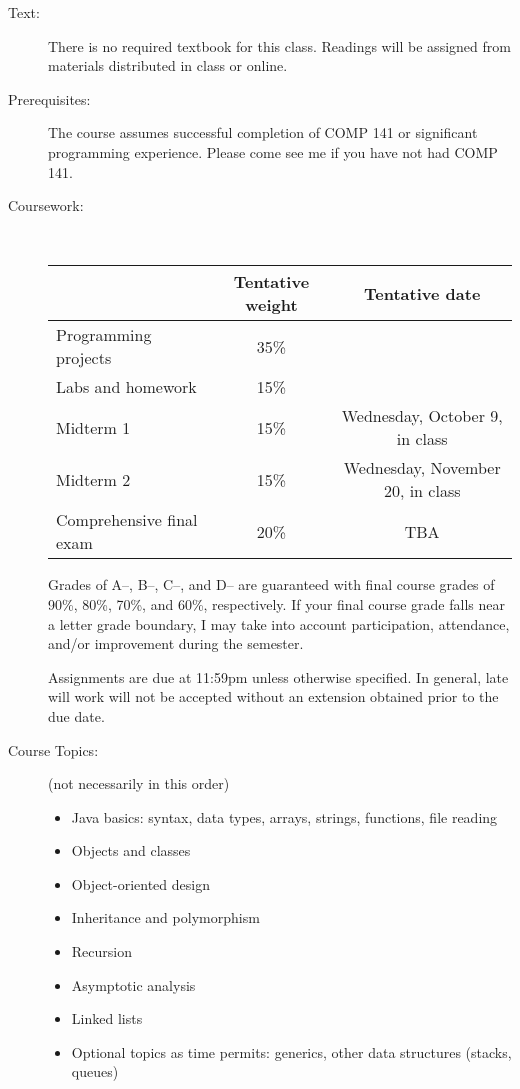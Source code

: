 \documentclass [letterpaper,11pt]{article}
\begin{document}
\begin{description}
\item[Text:]
   There is no required textbook for this class.  Readings will be assigned from materials distributed in class or online.

\item[Prerequisites:]
The course assumes successful completion of COMP 141 or significant programming experience.  Please come see me if you have not had COMP 141.

\item[Coursework:] \

\begin{tabular}{lcc} 
& Tentative weight & Tentative date \\ \hline
Programming projects & 35\% & \\
Labs and homework & 15\% & \\
Midterm 1 & 15\% & Wednesday, October 9, in class \\
Midterm 2 & 15\% & Wednesday, November 20, in class\\
Comprehensive final exam & 20\% & TBA\\
\end{tabular}

Grades of A--, B--, C--, and D-- are guaranteed with final course grades of 90\%, 80\%,
70\%, and 60\%, respectively.  If your final course grade falls near a letter grade boundary,
I may take into account participation, attendance, and/or improvement during the semester.

Assignments are due at 11:59pm unless otherwise specified.  In general, late will work
will not be accepted without an extension obtained prior to the due date.



\item[Course Topics:] (not necessarily in this order) 
\begin{itemize} \setlength{\itemsep}{0em}\setlength{\parskip}{0pt}
	\item Java basics: syntax, data types, arrays, strings, functions, file reading
	\item Objects and classes
	\item Object-oriented design
	\item Inheritance and polymorphism
	\item Recursion
	\item Asymptotic analysis
	\item Linked lists
	\item Optional topics as time permits: generics, other data structures (stacks, queues)
	\end{itemize}


\end{description}
\end{document}
